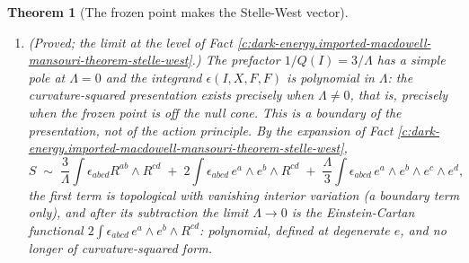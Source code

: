 \documentclass[11pt]{article}
\newtheorem{theorem}{Theorem}[section]
\theoremstyle{definition}
\theoremstyle{plain}
\begin{document}
\begin{theorem}[The frozen point makes the Stelle-West vector]
\begin{enumerate}
\item \emph{(Proved; the limit at the level of Fact \ref{c:dark-energy.imported-macdowell-mansouri-theorem-stelle-west}.)} The prefactor $1/Q(I) = 3/\Lambda$ has a simple pole at $\Lambda = 0$ and the integrand $\epsilon(I, X, F, F)$ is polynomial in $\Lambda$: the curvature-squared presentation exists precisely when $\Lambda \neq 0$, that is, precisely when the frozen point is off the null cone. This is a boundary of the presentation, not of the action principle. By the expansion of Fact \ref{c:dark-energy.imported-macdowell-mansouri-theorem-stelle-west},
\[
S \;\sim\; \frac{3}{\Lambda}\int \epsilon_{abcd}R^{ab}\wedge R^{cd} \;+\; 2\int \epsilon_{abcd}\,e^a\wedge e^b\wedge R^{cd} \;+\; \frac{\Lambda}{3}\int \epsilon_{abcd}\,e^a\wedge e^b\wedge e^c\wedge e^d ,
\]
the first term is topological with vanishing interior variation (a boundary term only), and after its subtraction the limit $\Lambda \to 0$ is the Einstein-Cartan functional $2\int\epsilon_{abcd}\,e^a\wedge e^b\wedge R^{cd}$: polynomial, defined at degenerate $e$, and no longer of curvature-squared form.
\end{enumerate}
\end{theorem}
\end{document}
